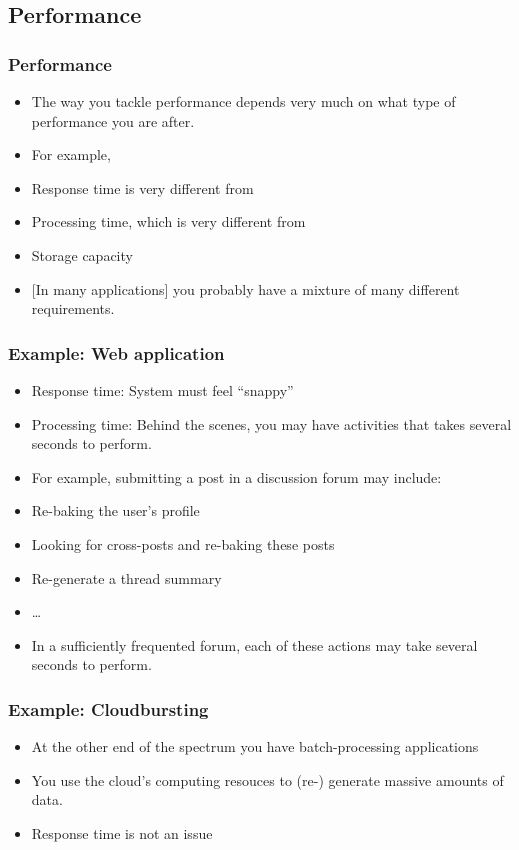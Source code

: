 \documentclass[10pt]{beamer}
\def\subitem{\item[\hspace{1.5cm} -]}
\begin{document}
\subsection{Performance}
\begin{frame}[t]
\frametitle{Performance}
\begin{itemize}
\item The way you tackle performance depends very much on what type of performance you are after.
\item For example,
\subitem Response time is very different from
\subitem Processing time, which is very different from
\subitem Storage capacity
\item {[In many applications]} you probably have a mixture of many different requirements.
\end{itemize}
\end{frame}

\begin{frame}[t]
\frametitle{Example: Web application}
\begin{itemize}
\item Response time: System must feel ``snappy''
\item Processing time: Behind the scenes, you may have activities that takes several seconds to perform.
\item For example, submitting a post in a discussion forum may include:
\subitem Re-baking the user's profile
\subitem Looking for cross-posts and re-baking these posts
\subitem Re-generate a thread summary
\subitem \ldots
\item In a sufficiently frequented forum, each of these actions may take several seconds to perform.
\end{itemize}
\end{frame}


\begin{frame}[t]
\frametitle{Example: Cloudbursting}
\begin{itemize}
\item At the other end of the spectrum you have batch-processing applications
\item You use the cloud's computing resouces to (re-) generate massive amounts of data.
\item Response time is not an issue
\end{itemize}
\end{frame}
\end{document}
